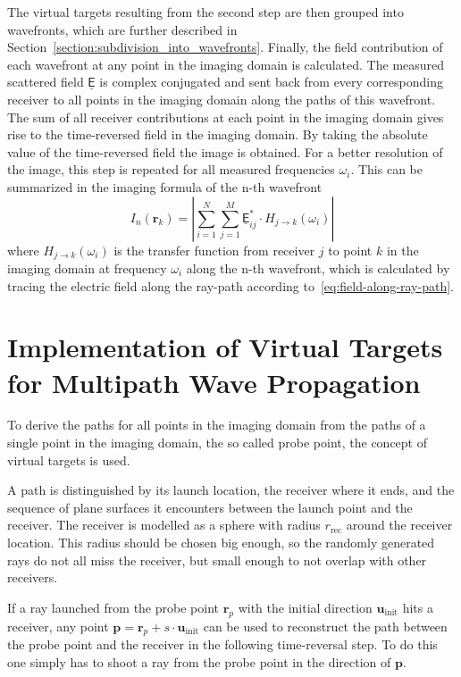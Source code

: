The virtual targets resulting from the second step are then grouped into wavefronts, which are further described in Section~\ref{section:subdivision_into_wavefronts}.
Finally, the field contribution of each wavefront at any point in the imaging domain is calculated.
The measured scattered field \(\underline{\mathsf{E}}\) is complex conjugated and sent back from every corresponding receiver to all points in the imaging domain along the paths of this wavefront.
The sum of all receiver contributions at each point in the imaging domain gives rise to the time-reversed field in the imaging domain.
By taking the absolute value of the time-reversed field the image is obtained.
For a better resolution of the image, this step is repeated for all measured frequencies \(\omega_i\).
This can be summarized in the imaging formula of the n-th wavefront
\begin{equation}
    I_n(\bm{r}_k) = |\sum_{i=1}^{N} \sum_{j=1}^{M} \underline{\mathsf{E}}_{ij}^* \cdot H_{j \rightarrow k}(\omega_i)|
\end{equation}
where \(H_{j \rightarrow k}(\omega_i)\) is the transfer function from receiver \(j\) to point \(k\) in the imaging domain at frequency \(\omega_i\) along the n-th wavefront, which is calculated by tracing the electric field along the ray-path according to~\eqref{eq:field-along-ray-path}.


\section{Implementation of Virtual Targets for Multipath Wave Propagation}\label{section:virtual_targets}
To derive the paths for all points in the imaging domain from the paths of a single point in the imaging domain, the so called probe point, the concept of virtual targets is used.

A path is distinguished by its launch location, the receiver where it ends, and the sequence of plane surfaces it encounters between the launch point and the receiver.
The receiver is modelled as a sphere with radius \(r_{\text{rec}}\) around the receiver location.
This radius should be chosen big enough, so the randomly generated rays do not all miss the receiver, but small enough to not overlap with other receivers.

If a ray launched from the probe point \(\bm{r}_p\) with the initial direction \(\bm{u}_{\text{init}}\) hits a receiver, any point \(\bm{p} = \bm{r}_p + s \cdot \bm{u}_{\text{init}}\) can be used to reconstruct the path between the probe point and the receiver in the following time-reversal step.
To do this one simply has to shoot a ray from the probe point in the direction of \(\bm{p}\).

